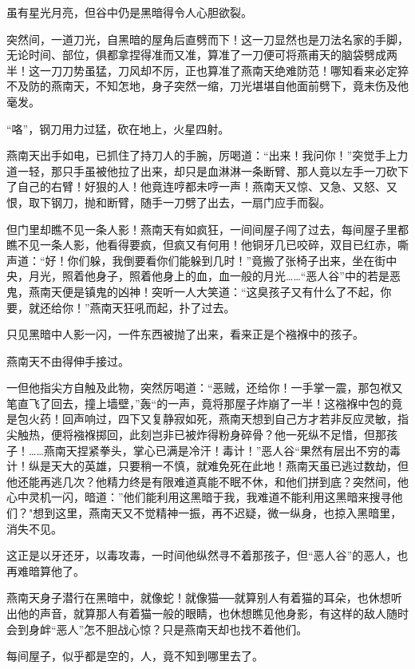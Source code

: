 \documentclass[12pt,oneside]{book}
\begin{document}
虽有星光月亮，但谷中仍是黑暗得令人心胆欲裂。

突然间，一道刀光，自黑暗的屋角后直劈而下！这一刀显然也是刀法名家的手脚，无论时间、部位，俱都拿捏得准而又准，算准了一刀便可将燕甫天的脑袋劈成两半！这一刀刀势虽猛，刀风却不厉，正也算准了燕南天绝难防范！哪知看来必定猝不及防的燕南天，不知怎地，身子突然一缩，刀光堪堪自他面前劈下，竟未伤及他毫发。

``咯''，钢刀用力过猛，砍在地上，火星四射。

燕南天出手如电，已抓住了持刀人的手腕，厉喝道：``出来！我问你！''突觉手上力道一轻，那只手虽被他拉了出来，却只是血淋淋一条断臂、那人竟以左手一刀砍下了自己的右臂！好狠的人！他竟连哼都未哼一声！燕南天又惊、又急、又怒、又恨，取下钢刀，抛和断臂，随手一刀劈了出去，一扇门应手而裂。

但门里却瞧不见一条人影！燕南天有如疯狂，一间间屋子闯了过去，每间屋子里都瞧不见一条人影，他看得要疯，但疯又有何用！他铜牙几已咬碎，双目已红赤，嘶声道：``好！你们躲，我倒要看你们能躲到几时！''竟搬了张椅子出来，坐在街中央，月光，照着他身子，照着他身上的血，血一般的月光\ldots\ldots{}``恶人谷''中的若是恶鬼，燕南天便是镇鬼的凶神！突听一人大笑道：``这臭孩子又有什么了不起，你要，就还给你！''燕南天狂吼而起，扑了过去。

只见黑暗中人影一闪，一件东西被抛了出来，看来正是个襁褓中的孩子。

燕南天不由得伸手接过。

一但他指尖方自触及此物，突然厉喝道：``恶贼，还给你！一手掌一震，那包袱又笔直飞了回去，撞上墙壁，''轰``的一声，竟将那屋子炸崩了一半！这襁褓中包的竟是包火药！回声响过，四下又复静寂如死，燕南天想到自己方才若非反应灵敏，指尖触热，便将襁褓掷回，此刻岂非已被炸得粉身碎骨？他一死纵不足惜，但那孩子！\ldots\ldots 燕南天捏紧拳头，掌心已满是冷汗！毒计！''恶人谷``果然有层出不穷的毒计！纵是天大的英雄，只要稍一不慎，就难免死在此地！燕南天虽已逃过数劫，但他还能再逃几次？他精力终是有限难道真能不眠不休，和他们拼到底？突然间，他心中灵机一闪，暗道：''他们能利用这黑暗于我，我难道不能利用这黑暗来搜寻他们？"想到这里，燕南天又不觉精神一振，再不迟疑，微一纵身，也掠入黑暗里，消失不见。

这正是以牙还牙，以毒攻毒，一时间他纵然寻不着那孩子，但``恶人谷''的恶人，也再难暗算他了。

燕南天身子潜行在黑暗中，就像蛇！就像猫──就算别人有着猫的耳朵，也休想听出他的声音，就算那人有着猫一般的眼睛，也休想瞧见他身影，有这样的敌人随时会到身衅``恶人''怎不胆战心惊？只是燕南天却也找不着他们。

每间屋子，似乎都是空的，人，竟不知到哪里去了。
\end{document}
